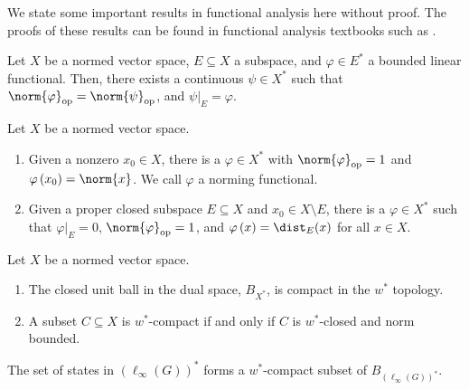 We state some important results in functional analysis here without proof. The proofs of these results can be found in functional analysis textbooks such as \cite{rudin_functional_analysis}.
\begin{theorem}
  Let $X$ be a normed vector space, $E\subseteq X$ a subspace, and $\varphi\in E^{\ast}$ a bounded linear functional. Then, there exists a continuous $\psi\in X^{\ast}$ such that $\norm{\varphi}_{\op} = \norm{\psi}_{\op}$, and $\psi|_{E} = \varphi$.
\end{theorem}
\begin{theorem}
  Let $X$ be a normed vector space.
  \begin{enumerate}[(1)]
    \item Given a nonzero $x_0\in X$, there is a $\varphi\in X^{\ast}$ with $\norm{\varphi}_{\op} = 1$ and $\varphi\left(x_0\right) = \norm{x}$. We call $\varphi$ a norming functional.
    \item Given a proper closed subspace $E\subseteq X$ and $x_0\in X\setminus E$, there is a $\varphi\in X^{\ast}$ such that $\varphi|_{E} = 0$, $\norm{\varphi}_{\op} = 1$, and $\varphi\left(x\right) = \dist_{E}(x)$ for all $x\in X$.
  \end{enumerate}
\end{theorem}
\begin{theorem}
  Let $X$ be a normed vector space.
  \begin{enumerate}[(1)]
    \item The closed unit ball in the dual space, $B_{X^{\ast}}$, is compact in the $w^{\ast}$ topology.
    \item A subset $C\subseteq X$ is $w^{\ast}$-compact if and only if $C$ is $w^{\ast}$-closed and norm bounded.
  \end{enumerate}
\end{theorem}
\begin{corollary}
  The set of states in $\left(\ell_{\infty}\left(G\right)\right)^{\ast}$ forms a $w^{\ast}$-compact subset of $B_{\left(\ell_{\infty}\left(G\right)\right)^{\ast}}$.
\end{corollary}
